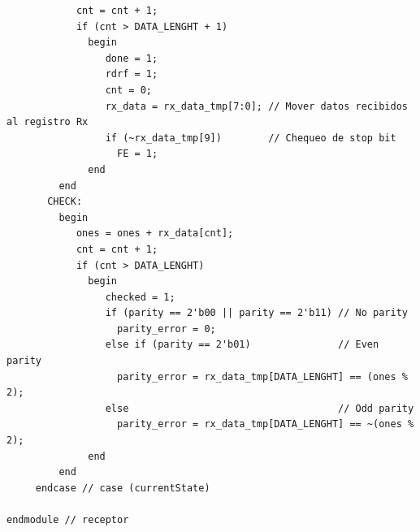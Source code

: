 \documentclass[11pt]{article}
\begin{document}
\begin{verbatim}
            cnt = cnt + 1;
            if (cnt > DATA_LENGHT + 1)
              begin
                 done = 1;
                 rdrf = 1;
                 cnt = 0;
                 rx_data = rx_data_tmp[7:0]; // Mover datos recibidos al registro Rx
                 if (~rx_data_tmp[9])        // Chequeo de stop bit
                   FE = 1;
              end
         end
       CHECK:
         begin
            ones = ones + rx_data[cnt];
            cnt = cnt + 1;
            if (cnt > DATA_LENGHT)
              begin
                 checked = 1;
                 if (parity == 2'b00 || parity == 2'b11) // No parity
                   parity_error = 0;
                 else if (parity == 2'b01)               // Even parity
                   parity_error = rx_data_tmp[DATA_LENGHT] == (ones % 2);
                 else                                    // Odd parity
                   parity_error = rx_data_tmp[DATA_LENGHT] == ~(ones % 2);
              end
         end
     endcase // case (currentState)

endmodule // receptor
\end{verbatim}
\end{document}
